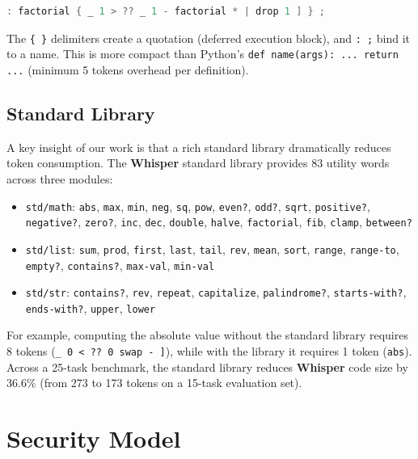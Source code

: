\documentclass[11pt,a4paper]{article}
\begin{document}
\begin{lstlisting}[language=C,basicstyle=\ttfamily\small\small]
: factorial { _ 1 > ?? _ 1 - factorial * | drop 1 ] } ;
\end{lstlisting}

The \texttt{\{ \}} delimiters create a quotation (deferred execution block),
and \texttt{: ;} bind it to a name. This is more compact than Python's
\texttt{def name(args): ... return ...} (minimum 5 tokens overhead per
definition).

\subsection{Standard Library}

A key insight of our work is that a rich standard library dramatically
reduces token consumption. The \textbf{Whisper} standard library provides 83
utility words across three modules:

\begin{itemize}
\item \texttt{std/math}: \texttt{abs}, \texttt{max}, \texttt{min},
  \texttt{neg}, \texttt{sq}, \texttt{pow}, \texttt{even?}, \texttt{odd?},
  \texttt{sqrt}, \texttt{positive?}, \texttt{negative?}, \texttt{zero?},
  \texttt{inc}, \texttt{dec}, \texttt{double}, \texttt{halve},
  \texttt{factorial}, \texttt{fib}, \texttt{clamp}, \texttt{between?}
\item \texttt{std/list}: \texttt{sum}, \texttt{prod}, \texttt{first},
  \texttt{last}, \texttt{tail}, \texttt{rev}, \texttt{mean}, \texttt{sort},
  \texttt{range}, \texttt{range-to}, \texttt{empty?}, \texttt{contains?},
  \texttt{max-val}, \texttt{min-val}
\item \texttt{std/str}: \texttt{contains?}, \texttt{rev}, \texttt{repeat},
  \texttt{capitalize}, \texttt{palindrome?}, \texttt{starts-with?},
  \texttt{ends-with?}, \texttt{upper}, \texttt{lower}
\end{itemize}

For example, computing the absolute value without the standard library
requires 8 tokens (\texttt{\_ 0 < ?? 0 swap - ]}), while with the library it
requires 1 token (\texttt{abs}). Across a 25-task benchmark, the standard
library reduces \textbf{Whisper} code size by 36.6\% (from 273 to 173 tokens
on a 15-task evaluation set).

\section{Security Model}
\label{sec:security}
\end{document}
